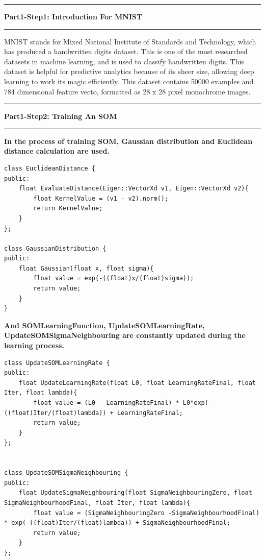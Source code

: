 \documentclass[11pt]{article}
\newcommand\question[2]{\vspace{.25in}\hrule\textbf{#1: #2}\vspace{.5em}\hrule\vspace{.10in}}
\begin{document}
\raggedright
\newcommand\NAME{Yao Xiao}  %
\newcommand\ANDREWID{2019180015}     %
\newcommand\HWNUM{3}              %


\question{Part1-Step1}{Introduction For MNIST} 
MNIST stands for Mixed National Institute of Standards and Technology, which has produced a handwritten digits dataset. This is one of the most researched datasets in machine learning, and is used to classify handwritten digits. 
This dataset is helpful for predictive analytics because of its sheer size, allowing deep learning to work its magic efficiently. This dataset contains 50000 examples and 784 dimensional feature vecto, formatted as 28 x 28 pixel monochrome images.


\question{Part1-Step2}{Training An SOM}
\textbf{In the process of training SOM, Gaussian distribution and Euclidean distance calculation are used.}

\begin{lstlisting}
class EuclideanDistance {
public:
    float EvaluateDistance(Eigen::VectorXd v1, Eigen::VectorXd v2){
        float KernelValue = (v1 - v2).norm();
        return KernelValue;
    }
};

class GaussianDistribution {
public:
    float Gaussian(float x, float sigma){
        float value = exp(-((float)x/(float)sigma));
        return value;
    }
}
\end{lstlisting}

\textbf{And SOMLearningFunction, UpdateSOMLearningRate, UpdateSOMSigmaNeighbouring are constantly updated during the learning process.}

\begin{lstlisting}
class UpdateSOMLearningRate {
public:
    float UpdateLearningRate(float L0, float LearningRateFinal, float Iter, float lambda){
        float value = (L0 - LearningRateFinal) * L0*exp(-((float)Iter/(float)lambda)) + LearningRateFinal;
        return value;
    }
};


class UpdateSOMSigmaNeighbouring {
public:
    float UpdateSigmaNeighbouring(float SigmaNeighbouringZero, float SigmaNeighbourhoodFinal, float Iter, float lambda){
        float value = (SigmaNeighbouringZero -SigmaNeighbourhoodFinal) * exp(-((float)Iter/(float)lambda)) + SigmaNeighbourhoodFinal;
        return value;
    }
};

\end{lstlisting}
\end{document}
